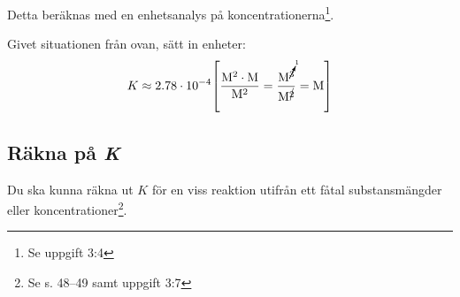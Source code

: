 Detta beräknas med en enhetsanalys på koncentrationerna\footnote{Se uppgift 3:4}.

\begin{exm}
    Givet situationen från ovan, sätt in enheter:
    \begin{equation*}
        K \approx 2.78 \cdot 10^{-4} \mathrm{ \left[\frac{M^2 \cdot M}{M^2} = \frac{M^{\cancelto{1}{3}}}{M^{\cancel{2}}} = M\right]}
    \end{equation*}
\end{exm}

\subsection{Räkna på \textit{K}}

Du ska kunna räkna ut $K$ för en viss reaktion utifrån ett fåtal substansmängder eller koncentrationer\footnote{Se s. 48--49 samt uppgift 3:7}.

